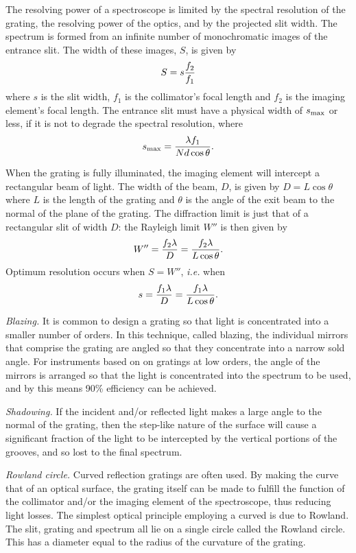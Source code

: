 The resolving power of a spectroscope is limited by the spectral resolution of the grating,
the resolving power of the optics, and by the projected slit width. The spectrum is formed
from an infinite number of monochromatic images of the entrance slit. The width of 
these images, $S$, is given by
\[
S=s{f_2\over f_1}
\]
where $s$ is the slit width, $f_1$ is the collimator's focal length and $f_2$ is the imaging element's focal length. The entrance slit must have a physical width of
$s_{\rm max}$ or less, if it is not to degrade the spectral resolution, where
\[
s_{\rm max}={\lambda f_1\over N d\cos\theta}.
\]

When the grating is fully illuminated, the imaging element will intercept a rectangular 
beam of light. The width of the beam, $D$, is given by $D=L\cos\theta$ where $L$ is 
the length of the grating and $\theta$ is the angle of the exit beam to the normal of the
plane of the grating. The diffraction limit is just that of a rectangular slit of width $D$:
the Rayleigh limit $W''$ is then given by 
\[
W''={f_2\lambda\over D}={f_2\lambda\over L\cos\theta}.
\]
Optimum resolution occurs when $S=W''$, {\it i.e.} when
\[ 
s={f_1\lambda\over D}={f_1\lambda\over L\cos\theta}.
\]

\noindent
{\it Blazing.} It is common to design a grating so that light is concentrated into a smaller
number of orders. In this technique, called blazing, the individual mirrors that comprise
the grating are angled so that they concentrate into a narrow sold angle. For instruments
based on on gratings at low orders, the angle of the mirrors is arranged so that the light
is concentrated into the spectrum to be used, and by this means 90\% efficiency can be
achieved. 

\noindent
{\it Shadowing.} If the incident and/or reflected light makes a large angle to the normal of
the grating, then the step-like nature of the surface will cause a significant fraction 
of the light to be intercepted by the vertical portions of the grooves, and so lost to the final spectrum. 

\noindent
{\it Rowland circle.} Curved reflection gratings are often used. By making the curve that of
an optical surface, the grating itself can be made to fulfill the function of the collimator
and/or the imaging element of the spectroscope, thus reducing light losses. The simplest optical principle employing a curved is due to Rowland. The slit, grating and 
spectrum all lie on a single circle called the Rowland circle. This has a diameter equal
to the radius of the curvature of the grating. 

